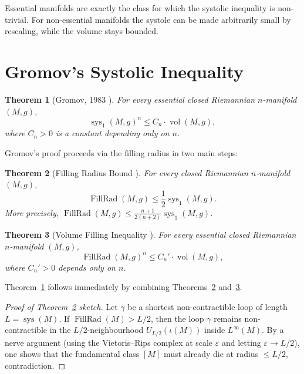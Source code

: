 \documentclass[12pt,a4paper]{amsart}
\newtheorem{theorem}{Theorem}[section]
\theoremstyle{definition}
\theoremstyle{remark}
\DeclareMathOperator{\sys}{sys}
\DeclareMathOperator{\FillRad}{FillRad}
\DeclareMathOperator{\vol}{vol}
\begin{document}
Essential manifolds are exactly the class for which the systolic inequality
is non-trivial.  For non-essential manifolds the systole can be made
arbitrarily small by rescaling, while the volume stays bounded.

\section{Gromov's Systolic Inequality}

\begin{theorem}[Gromov, 1983 \cite{Gromov1983}]
\label{thm:gromov-systolic}
For every essential closed Riemannian $n$-manifold $(M,g)$,
\[
  \sys_1(M,g)^n \le C_n \cdot \vol(M,g),
\]
where $C_n > 0$ is a constant depending only on $n$.
\end{theorem}

Gromov's proof proceeds via the filling radius in two main steps:

\begin{theorem}[Filling Radius Bound \cite{Gromov1983}]
\label{thm:fillrad-sys}
For every closed Riemannian $n$-manifold $(M,g)$,
\[
  \FillRad(M,g) \le \frac{1}{2} \sys_1(M,g).
\]
More precisely, $\FillRad(M,g) \le \tfrac{n+1}{2(n+2)} \sys_1(M,g)$.
\end{theorem}

\begin{theorem}[Volume Filling Inequality \cite{Gromov1983}]
\label{thm:vol-fillrad}
For every essential closed Riemannian $n$-manifold $(M,g)$,
\[
  \FillRad(M,g)^n \le C_n' \cdot \vol(M,g),
\]
where $C_n' > 0$ depends only on $n$.
\end{theorem}

Theorem~\ref{thm:gromov-systolic} follows immediately by combining
Theorems~\ref{thm:fillrad-sys} and~\ref{thm:vol-fillrad}.

\begin{proof}[Proof of Theorem~\ref{thm:fillrad-sys} sketch]
Let $\gamma$ be a shortest non-contractible loop of length $L = \sys(M)$.
If $\FillRad(M) > L/2$, then the loop $\gamma$ remains non-contractible in
the $L/2$-neighbourhood $U_{L/2}(\iota(M))$ inside $L^\infty(M)$.  By
a nerve argument (using the Vietoris--Rips complex at scale $\varepsilon$
and letting $\varepsilon \to L/2$), one shows that the fundamental class
$[M]$ must already die at radius $\le L/2$, contradiction.
\end{proof}
\end{document}
